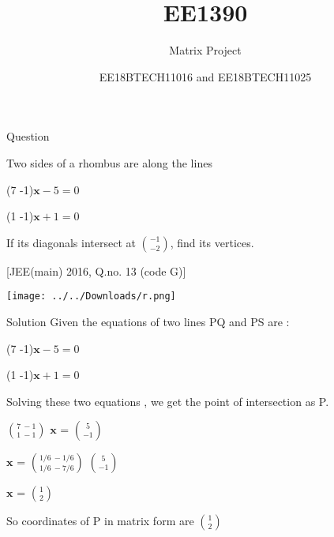 \documentclass{beamer}
\title[]{EE1390}
\subtitle{Matrix Project}
\author{EE18BTECH11016 and EE18BTECH11025}
\date{}
\begin{document}
\begin{frame}
\titlepage
\end{frame}

\begin{frame}{Question}

Two sides of a rhombus are along the lines


\setlength{\parindent}{4cm} 
		(7 -1)$\boldsymbol{x}-5=0$


		(1 -1)$\boldsymbol{x}+1=0$
		
		
\setlength{\parindent}{0cm} 
If its diagonals intersect at $\binom{-1}{-2}$, find its vertices.


\setlength{\parindent}{2cm}
[JEE(main) 2016, Q.no. 13 (code G)]
\end{frame}

 
\texttt{[image: ../../Downloads/r.png]} 

\begin{frame}{Solution}
Given the equations of two lines PQ and PS are :
\setlength{\parindent}{4cm}  

     
 (7 -1)$\boldsymbol{x}-5=0$

		    (1 -1)$\boldsymbol{x}+1=0$
\setlength{\parindent}{0cm}

Solving these two equations , we get the point of intersection as P.
\vspace{2 mm}
\setlength{\parindent}{4cm}

$\binom{7 \ -1}{1  \  -1}$ $\boldsymbol{x}$ = $\binom{5}{-1}$

\vspace{2 mm}
$\boldsymbol{x}$ =  $\binom{1/6 \  -1/6}{1/6  \   -7/6}$ $\binom{5}{-1}$

\vspace{2 mm}

$\boldsymbol{x}$ = $\binom{1}{2}$

\vspace{2 mm}
\setlength{\parindent}{0.5cm}

So coordinates of P in matrix form are $\binom{1}{2}$
\end{frame}
\end{document}
